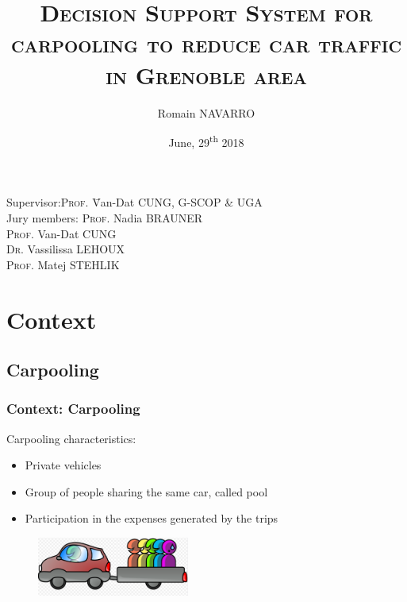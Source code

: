 \documentclass{beamer}
\title[Reducing Grenoble's car traffic]{\textsc{Decision Support System for carpooling to reduce car traffic in Grenoble area}}
\author{Romain NAVARRO}
\date{June, 29\textsuperscript{th} 2018}
\newcommand\tab[1][1cm]{\hspace*{#1}}
\begin{document}
	\begin{frame}[noframenumbering]
		\maketitle
		\begin{tabbing}
			Supervisor:\tab \= \textsc{Prof.} \=Van-Dat \textsc{CUNG}, G-SCOP \& UGA\\\medskip
			Jury members: \> \textsc{Prof.} \>Nadia \textsc{BRAUNER}\\
			\> \textsc{Prof.} \>Van-Dat \textsc{CUNG}\\
			\> \textsc{Dr.} \>Vassilissa \textsc{LEHOUX}\\
			\> \textsc{Prof.} \>Matej \textsc{STEHLIK}
		\end{tabbing}
	\end{frame}
	
	\begin{frame}
		\tableofcontents[hideallsubsections]
	\end{frame}
	\section{Context}
	\subsection{Carpooling}
	\begin{frame}[label=]
		\frametitle{Context: Carpooling}
		Carpooling characteristics:
		\begin{itemize}
			\item Private vehicles
			\item Group of people sharing the same car, called pool
			\item Participation in the expenses generated by the trips
		\end{itemize}
		\begin{figure}
			\includegraphics[width=5cm]{img/i_carpool}
		\end{figure}
	\end{frame}
\end{document}
